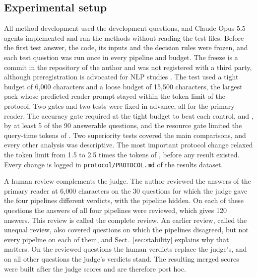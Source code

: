 \subsection{Experimental setup}
\label{sec:protocol}
All method development used the development questions, and Claude Opus 5.5 agents implemented and ran the methods without reading the test files. Before the first test answer, the code, its inputs and the decision rules were frozen, and each test question was run once in every pipeline and budget. The freeze is a commit in the repository of the author and was not registered with a third party, although preregistration is advocated for NLP studies \citep{vanmiltenburg2021prereg}. The test used a tight budget of 6,000 characters and a loose budget of 15,500 characters, the largest pack whose predicted reader prompt stayed within the token limit of the protocol. Two gates and two tests were fixed in advance, all for the primary reader. The accuracy gate required \lexb{} at the tight budget to beat each control, \hybrid{} and \hr{}, by at least 5 of the 90 answerable questions, and the resource gate limited the query-time tokens of \lexb{}. Two superiority tests covered the main comparisons, and every other analysis was descriptive. The most important protocol change relaxed the token limit from 1.5 to 2.5 times the tokens of \hybrid{}, before any \lexb{} result existed. Every change is logged in \texttt{protocol/PROTOCOL.md} of the results dataset.

A human review complements the judge. The author reviewed the answers of the primary reader at 6,000 characters on the 30 questions for which the judge gave the four pipelines different verdicts, with the pipeline hidden. On each of these questions the answers of all four pipelines were reviewed, which gives 120 answers. This review is called the complete review. An earlier review, called the unequal review, also covered questions on which the pipelines disagreed, but not every pipeline on each of them, and Sect.~\ref{sec:stability} explains why that matters. On the reviewed questions the human verdicts replace the judge's, and on all other questions the judge's verdicts stand. The resulting merged scores were built after the judge scores and are therefore post hoc.

